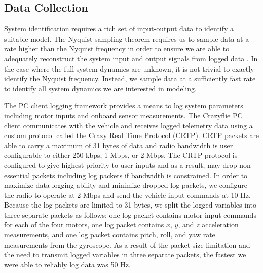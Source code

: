 \subsection{Data Collection}
System identification requires a rich set of input-output data to identify a suitable model. The Nyquist sampling theorem requires us to sample data at a rate higher than the Nyquist frequency in order to ensure we are able to adequately reconstruct the system input and output signals from logged data \cite{franklin1998digital}. In the case where the full system dynamics are unknown, it is not trivial to exactly identify the Nyquist frequency. Instead, we sample data at a sufficiently fast rate to identify all system dynamics we are interested in modeling. 

The PC client logging framework provides a means to log system parameters including motor inputs and onboard sensor measurements. The Crazyflie PC client communicates with the vehicle and receives logged telemetry data using a custom protocol called the Crazy Real Time Protocol (CRTP). CRTP packets are able to carry a maximum of 31 bytes of data and radio bandwidth is user configurable to either 250 kbps, 1 Mbps, or 2 Mbps. The CRTP protocol is configured to give highest priority to user inputs and as a result, may drop non-essential packets including log packets if bandwidth is constrained. In order to maximize data logging ability and minimize dropped log packets, we configure the radio to operate at 2 Mbps and send the vehicle input commands at 10 Hz. Because the log packets are limited to 31 bytes, we split the logged variables into three separate packets as follows: one log packet contains motor input commands for each of the four motors, one log packet contains $x$, $y$, and $z$ acceleration measurements, and one log packet contains pitch, roll, and yaw rate measurements from the gyroscope. As a result of the packet size limitation and the need to transmit logged variables in three separate packets, the fastest we were able to reliably log data was 50 Hz.

